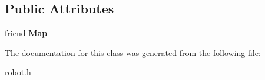 \subsection*{Public Attributes}
\begin{DoxyCompactItemize}
\item 
\hypertarget{classRobot_a932d0cd136fe1c245452740141526825}{friend {\bfseries Map}}\label{classRobot_a932d0cd136fe1c245452740141526825}

\end{DoxyCompactItemize}


The documentation for this class was generated from the following file\+:\begin{DoxyCompactItemize}
\item 
robot.\+h\end{DoxyCompactItemize}
